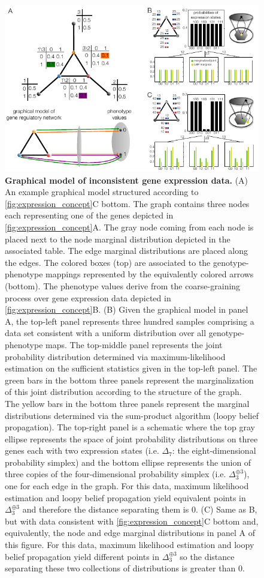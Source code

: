 \begin{figure}[!ht]
\centering
\noindent\includegraphics[width=0.9\columnwidth]{fig/inconsistentthreecycle.pdf}
\caption{{\bf Graphical model of inconsistent gene expression data.} (A) An example graphical model structured according to \ref{fig:expression_concept}C bottom. The graph contains three nodes each representing one of the genes depicted in \ref{fig:expression_concept}A. The gray node coming from each node is placed next to the node marginal distribution depicted in the associated table. The edge marginal distributions are placed along the edges. The colored boxes (top) are associated to the genotype-phenotype mappings represented by the equivalently colored arrows (bottom). The phenotype values derive from the coarse-graining process over gene expression data depicted in \ref{fig:expression_concept}B. (B) Given the graphical model in panel A, the top-left panel represents three hundred samples comprising a data set consistent with a uniform distribution over all genotype-phenotype maps. The top-middle panel represents the joint probability distribution determined via maximum-likelihood estimation on the sufficient statistics given in the top-left panel. The green bars in the bottom three panels represent the marginalization of this joint distribution according to the structure of the graph. The yellow bars in the bottom three panels represent the marginal distributions determined via the sum-product algorithm (loopy belief propagation). The top-right panel is a schematic where the top gray ellipse represents the space of joint probability distributions on three genes each with two expression states (i.e. $\Delta_7$: the eight-dimensional probability simplex) and the bottom ellipse represents the union of three copies of the four-dimensional probability simplex (i.e. $\Delta_3^{\oplus 3}$), one for each edge in the graph.  For this data, maximum likelihood estimation and loopy belief propagation yield equivalent points in $\Delta_3^{\oplus 3}$ and therefore the distance separating them is $0$. (C) Same as B, but with data consistent with \ref{fig:expression_concept}C bottom and, equivalently, the node and edge marginal distributions in panel A of this figure. For this data, maximum likelihood estimation and loopy belief propagation yield different points in $\Delta_3^{\oplus 3}$ so the distance separating these two collections of distributions is greater than $0$.}
\label{fig:inconsistentthreecycle}
\end{figure}

